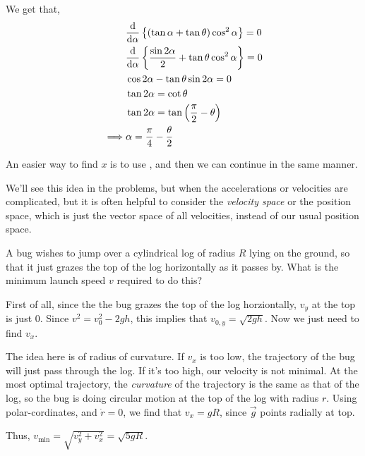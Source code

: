 \begin{example}
\begin{soln}
            We get that,
            \begin{align*}
                &\dv{}{\alpha} \left\{ 
                    (\tan \alpha + \tan \theta) \cos^2 \alpha 
                \right\} = 0 \\
                &\dv{}{\alpha} \left\{ 
                    \frac{\sin 2\alpha}{2} + \tan \theta 
                    \cos^2 \alpha 
                \right\} = 0 \\
                &\cos 2\alpha - \tan \theta \sin 2\alpha = 0 \\
                &\tan 2\alpha = \cot \theta \\
                &\tan 2\alpha = \tan\left( \frac{\pi}{2} - \theta \right) \\
                \implies &\alpha = \frac{\pi}{4} - \frac{\theta}{2}
                \end{align*}
             \end{soln}
             
             An easier way to find $x$ is to use , and then we can continue in the same
             manner.
    \end{example}


    We'll see this idea in the problems, but when the accelerations or velocities are complicated, but it is often helpful 
    to consider the \emph{velocity space} or the position space, which is just the vector space of all velocities, instead 
    of our usual position space.

    \begin{example}
        A bug wishes to jump over a cylindrical log of radius $R$ lying on the ground, so that it just
        grazes the top of the log horizontally as it passes by. What is the minimum launch speed $v$
        required to do this?

        \begin{soln}
            First of all, since the the bug grazes the top of the log horziontally, $v_y$ at the top is just 
            $0$. Since $v^2 = v_0^2 - 2gh$, this implies that $v_{0,y} = \sqrt{2gh}$. Now we just need to find $v_x$.
            
            The idea here is of radius of curvature. If $v_x$ is too low, the
            trajectory of the bug will just pass through the log. If it's too high, our velocity is not minimal. 
            At the most optimal trajectory, the \emph{curvature} of the trajectory is the same as that of the log, so
            the bug is doing circular motion at the top of the log with radius $r$. Using polar-cordinates, and $\dot{r} = 0$, we find that 
            $v_x = gR$, since $\vec{g}$ points radially at top.

            Thus, $v_{\text{min}} = \sqrt{v_y^2 + v_x^2} = \sqrt{5gR}$.
        \end{soln}
    \end{example}


